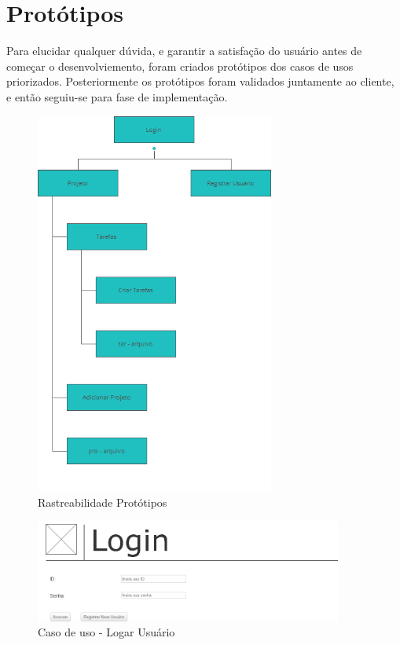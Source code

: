 \section{Protótipos}

Para elucidar qualquer dúvida, e garantir a satisfação do usuário antes de começar o desenvolviemento, foram criados protótipos dos casos de usos priorizados. Posteriormente os protótipos foram validados juntamente ao cliente, e então seguiu-se para fase de implementação.

\begin{figure}[H]
  \center
  \includegraphics[width=0.7\textwidth]{figuras/Prototipo1}
  \caption{Rastreabilidade Protótipos}
  \label{fig: Rastreabilidade-prototipos}
\end{figure}

\begin{figure}[H]
  \center
  \includegraphics[width=0.9\textwidth]{figuras/Prototipo2}
  \caption{Caso de uso - Logar Usuário}
  \label{fig:uc-logar-usuario}
\end{figure}

